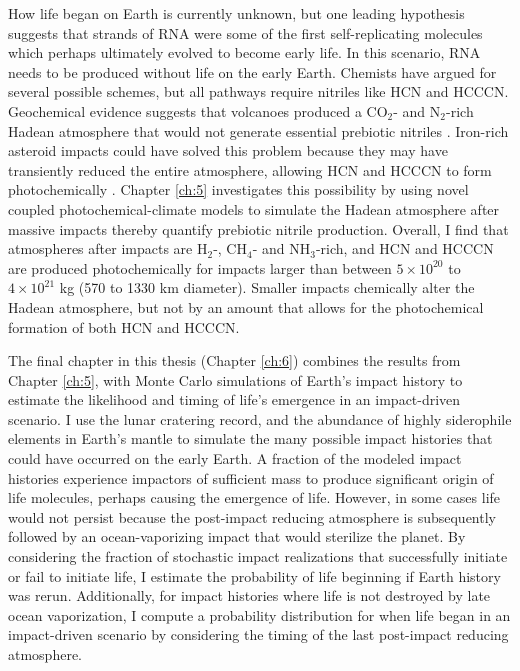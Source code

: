 How life began on Earth is currently unknown, but one leading hypothesis suggests that strands of RNA were some of the first self-replicating molecules which perhaps ultimately evolved to become early life. In this scenario, RNA needs to be produced without life on the early Earth. Chemists have argued for several possible schemes, but all pathways require nitriles like HCN and HCCCN. Geochemical evidence suggests that volcanoes produced a CO$_2$- and N$_2$-rich Hadean atmosphere that would not generate essential prebiotic nitriles \citep{Holland_1984}. Iron-rich asteroid impacts could have solved this problem because they may have transiently reduced the entire atmosphere, allowing HCN and HCCCN to form photochemically \citep{Zahnle_2020}. Chapter \ref{ch:5} investigates this possibility by using novel coupled photochemical-climate models to simulate the Hadean atmosphere after massive impacts thereby quantify prebiotic nitrile production. Overall, I find that atmospheres after impacts are H$_2$-, CH$_4$- and NH$_3$-rich, and HCN and HCCCN are produced photochemically for impacts larger than between $5 \times 10^{20}$ to $4 \times 10^{21}$ kg (570 to 1330 km diameter). Smaller impacts chemically alter the Hadean atmosphere, but not by an amount that allows for the photochemical formation of both HCN and HCCCN. 

The final chapter in this thesis (Chapter \ref{ch:6}) combines the results from Chapter \ref{ch:5}, with Monte Carlo simulations of Earth's impact history to estimate the likelihood and timing of life's emergence in an impact-driven scenario. I use the lunar cratering record, and the abundance of highly siderophile elements in Earth's mantle to simulate the many possible impact histories that could have occurred on the early Earth. A fraction of the modeled impact histories experience impactors of sufficient mass to produce significant origin of life molecules, perhaps causing the emergence of life. However, in some cases life would not persist because the post-impact reducing atmosphere is subsequently followed by an ocean-vaporizing impact that would sterilize the planet. By considering the fraction of stochastic impact realizations that successfully initiate or fail to initiate life, I estimate the probability of life beginning if Earth history was rerun. Additionally, for impact histories where life is not destroyed by late ocean vaporization, I compute a probability distribution for when life began in an impact-driven scenario by considering the timing of the last post-impact reducing atmosphere.
